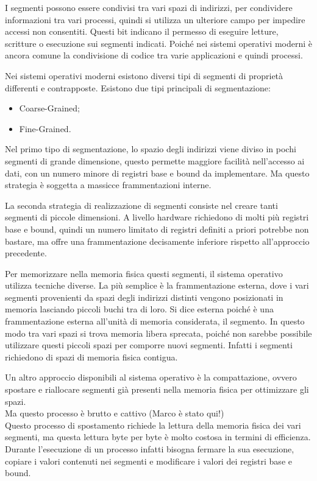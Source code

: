 \documentclass{article}
\numberwithin{equation}{subsection}
\begin{document}

I segmenti possono essere condivisi tra vari spazi di indirizzi, per condividere informazioni tra vari processi, quindi si utilizza un ulteriore campo per impedire 
accessi non consentiti. Questi bit indicano il permesso di eseguire letture, scritture o esecuzione sui segmenti indicati. Poiché nei sistemi operativi moderni 
è ancora comune la condivisione di codice tra varie applicazioni e quindi processi. 

Nei sistemi operativi moderni esistono diversi tipi di segmenti di proprietà differenti e contrapposte. Esistono due tipi principali di segmentazione:
\begin{itemize}
    \item Coarse-Grained;
    \item Fine-Grained.
\end{itemize}

Nel primo tipo di segmentazione, lo spazio degli indirizzi viene diviso in pochi segmenti di grande dimensione, questo permette maggiore facilità nell'accesso ai dati, 
con un numero minore di registri base e bound da implementare. Ma questo strategia è soggetta a massicce frammentazioni interne. 

La seconda strategia di realizzazione di segmenti consiste nel creare tanti segmenti di piccole dimensioni. A livello hardware richiedono di molti più registri base 
e bound, quindi un numero limitato di registri definiti a priori potrebbe non bastare, ma offre una frammentazione decisamente inferiore rispetto all'approccio 
precedente. 

Per memorizzare nella memoria fisica questi segmenti, il sistema operativo utilizza tecniche diverse. La più semplice è la frammentazione esterna, dove i vari segmenti 
provenienti da spazi degli indirizzi distinti vengono posizionati in memoria lasciando piccoli buchi tra di loro. Si dice esterna poiché è una frammentazione esterna 
all'unità di memoria considerata, il segmento. In questo modo tra vari spazi si trova memoria libera sprecata, poiché non sarebbe possibile utilizzare questi piccoli 
spazi per comporre nuovi segmenti. Infatti i segmenti richiedono di spazi di memoria fisica contigua.  

Un altro approccio disponibili al sistema operativo è la compattazione, ovvero spostare e riallocare segmenti già presenti nella memoria fisica per ottimizzare gli 
spazi. \\Ma questo processo è brutto e cattivo (Marco è stato qui!) \\ %
Questo processo di spostamento richiede la lettura della memoria fisica dei vari segmenti, ma questa lettura byte per byte è molto costosa in termini di efficienza. 
Durante l'esecuzione di un processo infatti bisogna fermare la sua esecuzione, copiare i valori contenuti nei segmenti e modificare i valori dei registri base e bound. 
\end{document}
